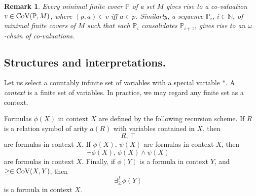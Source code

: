 \documentclass[12pt]{amsart}
\theoremstyle{plain}
\newtheorem{remark}[theorem]{\bf Remark}
\newcommand \rng{{\rm{ rng}}}
\newcommand \Val{{\rm{CoV}}}
\newcommand \fr{\scriptscriptstyle{f}}
\newcommand \NN{\mathbb{N}}
\newcommand \PPb{\mathbb{P}}
\begin{document}
\begin{remark}	
\label{re:CovertoVal}
	Every minimal finite cover $\PPb$ of a set $M$  gives rise to a co-valuation $v \in \Val(\PPb,M)$, where $(p,a) \in v$ iff $a \in p$. Similarly, a sequence $\PPb_i$, $i \in \NN$, of minimal finite covers of $M$  such that each $\PPb_i$ consolidates $\PPb_{i+1}$, gives rise to an $\omega$-chain of co-valuations. 
\end{remark}
	
	
	
	
\subsection{Structures and interpretations.} Let us select a countably infinite set of variables with a special variable $*$. A \emph{context} is a finite set of variables. In practice, we may regard any finite set as a context.
	
Formulas $\phi(X)$ in context $X$ are defined by the following recursion scheme. If $R$ is a relation symbol of arity $a(R)$ with variables contained in $X$, then
%
\[R, \, \top \]
%
are formulas in context $X$.
%
If $\phi(X)$, $\psi(X)$ are formulas in context $X$, then
%
\[ \neg\phi(X), \, \phi(X) \land \psi(X) \]
%
are formulas in context $X$.
%
Finally, if $\phi(Y)$ is a formula in context $Y$, and $\geq \in \Val(X,Y)$, then
%
\[ \exists^{\fr}_{\geq} \phi(Y) \]
%
is a formula in context $X$.
\end{document}
